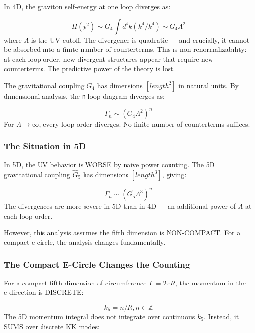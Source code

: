 \documentclass[aps,prd,preprint,superscriptaddress,longbibliography,floatfix]{revtex4-2}
\theoremstyle{remark}
\begin{document}
In 4D, the graviton self-energy at one loop diverges as:


\begin{equation}
    \Pi(p^{2}) \sim  G_{4} \int d^{4}k (k^{4}/k^{4}) \sim  G_{4} \Lambda^{2}
\end{equation}
where $\Lambda$ is the UV cutoff. The divergence is quadratic --- and crucially, it cannot be absorbed into a finite number of counterterms. This is non-renormalizability: at each loop order, new divergent structures appear that require new counterterms. The predictive power of the theory is lost.

The gravitational coupling $G_{4}$ has dimensions $[length^{2}]$ in natural units. By dimensional analysis, the \texttt{n}-loop diagram diverges as:


\begin{equation}
    \Gamma_n \sim  (G_{4} \Lambda^{2})^{n}
\end{equation}
For $\Lambda \to \infty$, every loop order diverges. No finite number of counterterms suffices.


\subsubsection{The Situation in 5D}

In 5D, the UV behavior is WORSE by naive power counting. The 5D gravitational coupling $\hat{G}_{5}$ has dimensions $[length^{3}]$, giving:


\begin{equation}
    \Gamma_n \sim  (\hat{G}_{5} \Lambda^{3})^{n}
\end{equation}
The divergences are more severe in 5D than in 4D --- an additional power of $\Lambda$ at each loop order.

However, this analysis assumes the fifth dimension is NON-COMPACT. For a compact e-circle, the analysis changes fundamentally.


\subsubsection{The Compact E-Circle Changes the Counting}

For a compact fifth dimension of circumference $L = 2\pi R$, the momentum in the e-direction is DISCRETE:


\begin{equation}
    k_{5} = n/R,     n \in \mathbb{Z}
\end{equation}
The 5D momentum integral does not integrate over continuous $k_{5}$. Instead, it SUMS over discrete KK modes:
\end{document}
